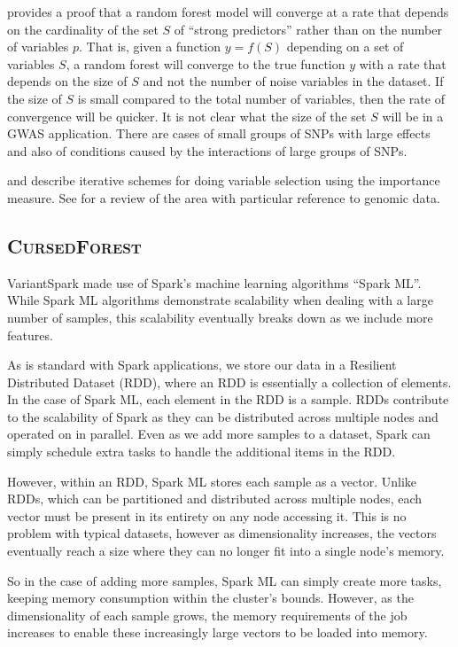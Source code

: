 \documentclass[10pt,letterpaper]{article}
\newcommand{\cursedforest}{\textsc{CursedForest}\xspace}
\begin{document}
\cite{Biau.2012} provides a proof that a random forest model will converge at a rate that depends on
the cardinality of the set $S$ of ``strong predictors'' rather than on the number of variables $p$. That is, given a
function $y=f(S)$ depending on a set of variables $S$, a random forest will converge to the true function $y$ with a
rate that depends on the size of $S$ and not the number of noise variables in the dataset. If the size of $S$ is small
compared to the total number of variables, then the rate of convergence will be quicker. It is not clear what the size
of the set $S$ will be in a GWAS application. There are cases of small groups of SNPs with large effects and also of
conditions caused by the interactions of large groups of SNPs.

\cite{Genuer.et.al.2010} and \cite{Diaz.and.Alvarez.2006} describe iterative schemes for doing variable selection using
the importance measure. See \cite{Chen.and.Ishwaran.2012} for a review of the area with particular reference to genomic
data.

\subsection{\cursedforest}
VariantSpark made use of Spark's machine learning algorithms ``Spark ML''. While Spark ML algorithms demonstrate
scalability when dealing with a large number of samples, this scalability eventually breaks down as we include more
features.

As is standard with Spark applications, we store our data in a Resilient Distributed Dataset (RDD), where an RDD is
essentially a collection of elements. In the case of Spark ML, each element in the RDD is a sample. RDDs contribute to
the scalability of Spark as they can be distributed across multiple nodes and operated on in parallel. Even as we add more
samples to a dataset, Spark can simply schedule extra tasks to handle the additional items in the RDD.

However, within an RDD, Spark ML stores each sample as a vector. Unlike RDDs, which can be partitioned and distributed
across multiple nodes, each vector must be present in its entirety on any node accessing it. This is no problem with
typical datasets, however as dimensionality increases, the vectors eventually reach a size where they can no longer fit
into a single node's memory.

So in the case of adding more samples, Spark ML can simply create more tasks, keeping memory consumption within the
cluster's bounds. However, as the dimensionality of each sample grows, the memory requirements of the job increases to
enable these increasingly large vectors to be loaded into memory.  
\end{document}
